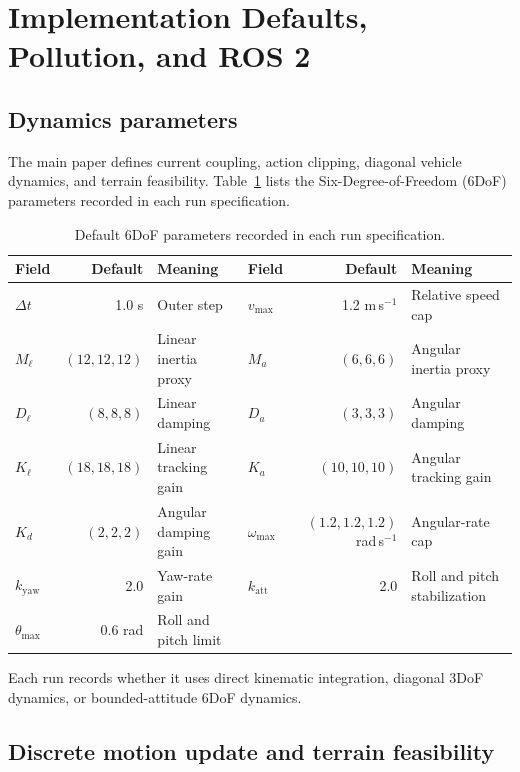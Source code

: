 \section{Implementation Defaults, Pollution, and ROS 2}
\label{app:models_ros}

\subsection{Dynamics parameters}

The main paper defines current coupling, action clipping, diagonal vehicle dynamics, and terrain feasibility. Table~\ref{tab:app_dynamics_defaults} lists the Six-Degree-of-Freedom (6DoF) parameters recorded in each run specification.

\begin{table}[t]
\centering
\scriptsize
\setlength{\tabcolsep}{4pt}
\renewcommand{\arraystretch}{1.08}
\begin{tabularx}{\textwidth}{l r X l r X}
\toprule
\textbf{Field} & \textbf{Default} & \textbf{Meaning} & \textbf{Field} & \textbf{Default} & \textbf{Meaning} \\
\midrule
$\Delta t$ & 1.0 s & Outer step & $v_{\max}$ & 1.2 m\,s$^{-1}$ & Relative speed cap \\
$M_\ell$ & $(12,12,12)$ & Linear inertia proxy & $M_a$ & $(6,6,6)$ & Angular inertia proxy \\
$D_\ell$ & $(8,8,8)$ & Linear damping & $D_a$ & $(3,3,3)$ & Angular damping \\
$K_\ell$ & $(18,18,18)$ & Linear tracking gain & $K_a$ & $(10,10,10)$ & Angular tracking gain \\
$K_d$ & $(2,2,2)$ & Angular damping gain & $\omega_{\max}$ & $(1.2,1.2,1.2)$ rad\,s$^{-1}$ & Angular-rate cap \\
$k_{\mathrm{yaw}}$ & 2.0 & Yaw-rate gain & $k_{\mathrm{att}}$ & 2.0 & Roll and pitch stabilization \\
$\theta_{\max}$ & 0.6 rad & Roll and pitch limit & & & \\
\bottomrule
\end{tabularx}
\caption{Default 6DoF parameters recorded in each run specification.}
\label{tab:app_dynamics_defaults}
\end{table}

Each run records whether it uses direct kinematic integration, diagonal 3DoF dynamics, or bounded-attitude 6DoF dynamics.

\subsection{Discrete motion update and terrain feasibility}

